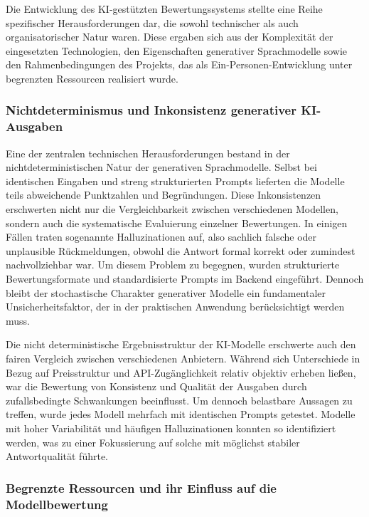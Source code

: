 \documentclass[a4paper,12pt]{article}
\begin{document}
Die Entwicklung des KI-gestützten Bewertungssystems stellte eine Reihe spezifischer Herausforderungen dar, die sowohl technischer als auch organisatorischer Natur waren. Diese ergaben sich aus der Komplexität der eingesetzten Technologien, den Eigenschaften generativer Sprachmodelle sowie den Rahmenbedingungen des Projekts, das als Ein-Personen-Entwicklung unter begrenzten Ressourcen realisiert wurde.

\subsubsection{Nichtdeterminismus und Inkonsistenz generativer KI-Ausgaben}
Eine der zentralen technischen Herausforderungen bestand in der nichtdeterministischen Natur der generativen Sprachmodelle. Selbst bei identischen Eingaben und streng strukturierten Prompts lieferten die Modelle teils abweichende Punktzahlen und Begründungen. Diese Inkonsistenzen erschwerten nicht nur die Vergleichbarkeit zwischen verschiedenen Modellen, sondern auch die systematische Evaluierung einzelner Bewertungen. In einigen Fällen traten sogenannte Halluzinationen auf, also sachlich falsche oder unplausible Rückmeldungen, obwohl die Antwort formal korrekt oder zumindest nachvollziehbar war. Um diesem Problem zu begegnen, wurden strukturierte Bewertungsformate und standardisierte Prompts im Backend eingeführt. Dennoch bleibt der stochastische Charakter generativer Modelle ein fundamentaler Unsicherheitsfaktor, der in der praktischen Anwendung berücksichtigt werden muss.

Die nicht deterministische Ergebnisstruktur der KI-Modelle erschwerte auch den fairen Vergleich zwischen verschiedenen Anbietern. Während sich Unterschiede in Bezug auf Preisstruktur und API-Zugänglichkeit relativ objektiv erheben ließen, war die Bewertung von Konsistenz und Qualität der Ausgaben durch zufallsbedingte Schwankungen beeinflusst. Um dennoch belastbare Aussagen zu treffen, wurde jedes Modell mehrfach mit identischen Prompts getestet. Modelle mit hoher Variabilität und häufigen Halluzinationen konnten so identifiziert werden, was zu einer Fokussierung auf solche mit möglichst stabiler Antwortqualität führte.

\subsubsection{Begrenzte Ressourcen und ihr Einfluss auf die Modellbewertung}
\end{document}
